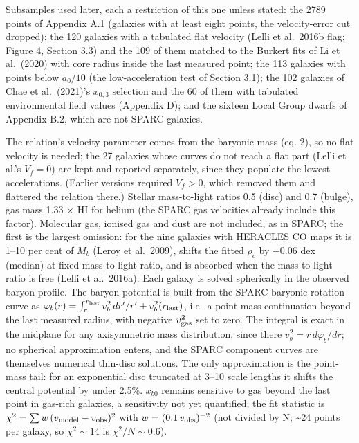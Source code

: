 \documentclass[
  10pt,
]{article}
\begin{document}
Subsamples used later, each a restriction of this one unless stated: the 2789 points of Appendix A.1 (galaxies with at least eight points, the velocity-error cut dropped); the 120 galaxies with a tabulated flat velocity (Lelli et al.~2016b flag; Figure 4, Section 3.3) and the 109 of them matched to the Burkert fits of Li et al.~(2020) with core radius inside the last measured point; the 113 galaxies with points below $a_0/10$ (the low-acceleration test of Section 3.1); the 102 galaxies of Chae et al.~(2021)'s $x_{0,3}$ selection and the 60 of them with tabulated environmental field values (Appendix D); and the sixteen Local Group dwarfs of Appendix B.2, which are not SPARC galaxies.

The relation's velocity parameter comes from the baryonic mass (eq. 2), so no flat velocity is needed; the 27 galaxies whose curves do not reach a flat part (Lelli et al.'s $V_f=0$) are kept and reported separately, since they populate the lowest accelerations. (Earlier versions required $V_f>0$, which removed them and flattered the relation there.) Stellar mass-to-light ratios 0.5 (disc) and 0.7 (bulge), gas mass 1.33 $\times$ HI for helium (the SPARC gas velocities already include this factor). Molecular gas, ionised gas and dust are not included, as in SPARC; the first is the largest omission: for the nine galaxies with HERACLES CO maps it is 1--10 per cent of $M_b$ (Leroy et al.~2009), shifts the fitted $\rho_c$ by $-0.06$ dex (median) at fixed mass-to-light ratio, and is absorbed when the mass-to-light ratio is free (Lelli et al.~2016a). Each galaxy is solved spherically in the observed baryon profile. The baryon potential is built from the SPARC baryonic rotation curve as $\varphi_b(r)=\int_r^{r_{\rm last}}v_b^2\,dr'/r'+v_b^2(r_{\rm last})$, i.e.\ a point-mass continuation beyond the last measured radius, with negative $v_{\rm gas}^2$ set to zero. The integral is exact in the midplane for any axisymmetric mass distribution, since there $v_b^2=r\,d\varphi_b/dr$; no spherical approximation enters, and the SPARC component curves are themselves numerical thin-disc solutions. The only approximation is the point-mass tail: for an exponential disc truncated at 3--10 scale lengths it shifts the central potential by under 2.5\%. $x_{b0}$ remains sensitive to gas beyond the last point in gas-rich galaxies, a sensitivity not yet quantified; the fit statistic is $\chi^2=\sum w\,(v_{\rm model}-v_{\rm obs})^2$ with $w=(0.1\,v_{\rm obs})^{-2}$ (not divided by N; \textasciitilde{}24 points per galaxy, so $\chi^2\sim 14$ is $\chi^2/N\sim 0.6$).
\end{document}

